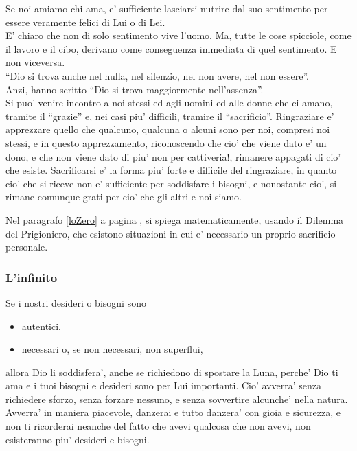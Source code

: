 Se noi amiamo chi ama, e' sufficiente lasciarsi nutrire dal suo sentimento per essere veramente felici di Lui o di Lei.\\
E' chiaro che non di solo sentimento vive l'uomo. Ma, tutte le cose spicciole, come il lavoro e il cibo, derivano come conseguenza immediata di quel sentimento. E non viceversa.\\

``Dio si trova anche nel nulla, nel silenzio, nel non avere, nel non essere''.\\
Anzi, hanno scritto ``Dio si trova maggiormente nell'assenza''.\\

Si puo' venire incontro a noi stessi ed agli uomini ed alle donne che ci amano, tramite il ``grazie'' e, nei casi piu' difficili, tramire il ``sacrificio''. Ringraziare e' apprezzare quello che qualcuno, qualcuna o alcuni sono per noi, compresi noi stessi, e in questo apprezzamento, riconoscendo che cio' che viene dato e' un dono, e che non viene dato di piu' non per cattiveria!, rimanere appagati di cio' che esiste. Sacrificarsi e' la forma piu' forte e difficile del ringraziare, in quanto cio' che si riceve non e' sufficiente per soddisfare i bisogni, e nonostante cio', si rimane comunque grati per cio' che gli altri e noi siamo. 

Nel paragrafo \ref{loZero} a pagina \pageref{loZero}, si spiega matematicamente, usando il Dilemma del Prigioniero, che esistono situazioni in cui e' necessario un proprio sacrificio personale.

\subsubsection{L'infinito}

Se i nostri desideri o bisogni sono 
\begin{itemize}
    \item autentici,
    \item necessari o, se non necessari, non superflui,
\end{itemize}
allora Dio li soddisfera', anche se richiedono di spostare la Luna, perche' Dio ti ama e i tuoi bisogni e desideri sono per Lui importanti. Cio' avverra' senza richiedere sforzo, senza forzare nessuno, e senza sovvertire alcunche' nella natura. Avverra' in maniera piacevole, danzerai e tutto danzera' con gioia e sicurezza, e non ti ricorderai neanche del fatto che avevi qualcosa che non avevi, non esisteranno piu' desideri e bisogni.\\

